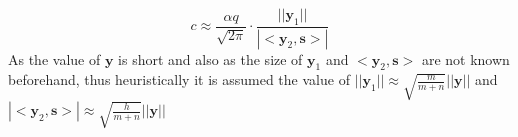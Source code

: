 \begin{equation*}
    c \approx \frac{\alpha q}{\sqrt{2\pi}} \cdot \frac{||\pmb{y}_1||}{|<\pmb{y}_2,\pmb{s}>|}
\end{equation*}
As the value of $\pmb{y}$ is short and also as the size of $\pmb{y}_1$ and $<\pmb{y}_2, \pmb{s}>$ are not known beforehand, thus heuristically it is assumed the value of $||\pmb{y}_1|| \approx \sqrt{\frac{m}{m+n}} ||\pmb{y}||$ and $|<\pmb{y}_2,\pmb{s}>| \approx \sqrt{\frac{h}{m+n}} ||\pmb{y}||$














\begin{comment}
In case of small secret LWE instances we have $||\pmb{s}|| < ||\pmb{e}||$. Hence, we may permit $||\pmb{v}|| > ||\pmb{w}||$ such that
\begin{equation*}
    ||<\pmb{w}, \pmb{s}>|| \approx ||<\pmb{v}, \pmb{e}>||
\end{equation*}

Now to find the optimal value of $c$. Lattice reduction produces a vector $(\pmb{w}, \pmb{v})$ with
\begin{equation*}
    ||(\pmb{w}, \pmb{v})|| \equiv \delta^{m'} \cdot (q/c)^{n/m'}
\end{equation*}
which translates to a noise value
\begin{equation*}
    e = \pmb{w} \cdot \pmb{A} \cdot \pmb{s} + <\pmb{w}, \pmb{e}> = <c \cdot \pmb{v}, \pmb{s}> + <\pmb{w}, \pmb{e}>
\end{equation*}
to equalise the noise contributions of both parts of the above sum we set $c$ as
\begin{equation*}
    c = \frac{\alpha q}{\sqrt{2 \pi h}} \cdot\sqrt{m'-n}
\end{equation*}
end{comment}

\begin{lemma}
    Let $m'=2n$ and $c=\frac{\alpha q}{\sqrt{2\pi h}\cdot \sqrt{m'-n}}$. A lattice reduction algorithm achieving $\delta_0$ such that
    \begin{equation*}
        \log {\delta_0} =\frac{\log {(\frac{2n \log^2{\epsilon}})}}{8n}
    \end{equation*}
    leads to an algorithm solving decisional LWE with $s \leftarrow B^-_h$ instance with advantage $\epsilon$ and the same cost.
\end{lemma}


\end{comment}
